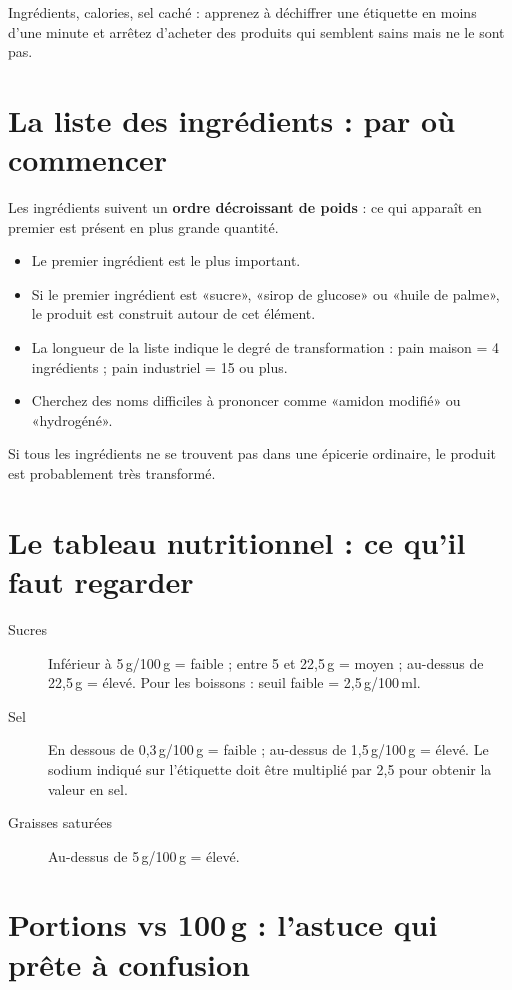 \documentclass[a5paper,12pt,oneside,openany]{book}
\newcommand{\boxinfo}[2]{%
  \begin{tcolorbox}[boitebase,
    colback=bleuinfo!8!white, colframe=bleuinfo, title={#1}]
  #2\end{tcolorbox}}
\begin{document}
Ingrédients, calories, sel caché : apprenez à déchiffrer une étiquette en moins
d'une minute et arrêtez d'acheter des produits qui semblent sains mais ne le sont pas.

\section{La liste des ingrédients : par où commencer}

Les ingrédients suivent un \textbf{ordre décroissant de poids} : ce qui apparaît
en premier est présent en plus grande quantité.

\begin{itemize}
  \item Le premier ingrédient est le plus important.
  \item Si le premier ingrédient est «sucre», «sirop de glucose» ou «huile de
    palme», le produit est construit autour de cet élément.
  \item La longueur de la liste indique le degré de transformation : pain maison
    = 4 ingrédients ; pain industriel = 15 ou plus.
  \item Cherchez des noms difficiles à prononcer comme «amidon modifié» ou
    «hydrogéné».
\end{itemize}

\boxinfo{Règle pratique}{Si tous les ingrédients ne se trouvent pas dans une
épicerie ordinaire, le produit est probablement très transformé.}

\section{Le tableau nutritionnel : ce qu'il faut regarder}

\begin{description}
  \item[Sucres] Inférieur à 5\,g/100\,g = faible ; entre 5 et 22,5\,g = moyen ;
    au-dessus de 22,5\,g = élevé. Pour les boissons : seuil faible = 2,5\,g/100\,ml.
  \item[Sel] En dessous de 0,3\,g/100\,g = faible ; au-dessus de 1,5\,g/100\,g
    = élevé. Le sodium indiqué sur l'étiquette doit être multiplié par 2,5 pour
    obtenir la valeur en sel.
  \item[Graisses saturées] Au-dessus de 5\,g/100\,g = élevé.
\end{description}

\section{Portions vs 100\,g : l'astuce qui prête à confusion}
\end{document}
